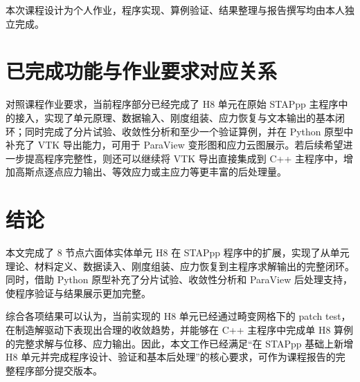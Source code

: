 \documentclass[12pt,a4paper]{article}
\begin{document}
本次课程设计为个人作业，程序实现、算例验证、结果整理与报告撰写均由本人独立完成。

\section{已完成功能与作业要求对应关系}

对照课程作业要求，当前程序部分已经完成了 H8 单元在原始 STAPpp 主程序中的接入，实现了单元原理、数据输入、刚度组装、应力恢复与文本输出的基本闭环；同时完成了分片试验、收敛性分析和至少一个验证算例，并在 Python 原型中补充了 VTK 导出能力，可用于 ParaView 变形图和应力云图展示。若后续希望进一步提高程序完整性，则还可以继续将 VTK 导出直接集成到 C++ 主程序中，增加高斯点逐点应力输出、等效应力或主应力等更丰富的后处理量。

\section{结论}

本文完成了 8 节点六面体实体单元 H8 在 STAPpp 程序中的扩展，实现了从单元理论、材料定义、数据读入、刚度组装、应力恢复到主程序求解输出的完整闭环。同时，借助 Python 原型补充了分片试验、收敛性分析和 ParaView 后处理支持，使程序验证与结果展示更加完整。

综合各项结果可以认为，当前实现的 H8 单元已经通过畸变网格下的 patch test，在制造解驱动下表现出合理的收敛趋势，并能够在 C++ 主程序中完成单 H8 算例的完整求解与位移、应力输出。因此，本文工作已经满足“在 STAPpp 基础上新增 H8 单元并完成程序设计、验证和基本后处理”的核心要求，可作为课程报告的完整程序部分提交版本。
\end{document}
